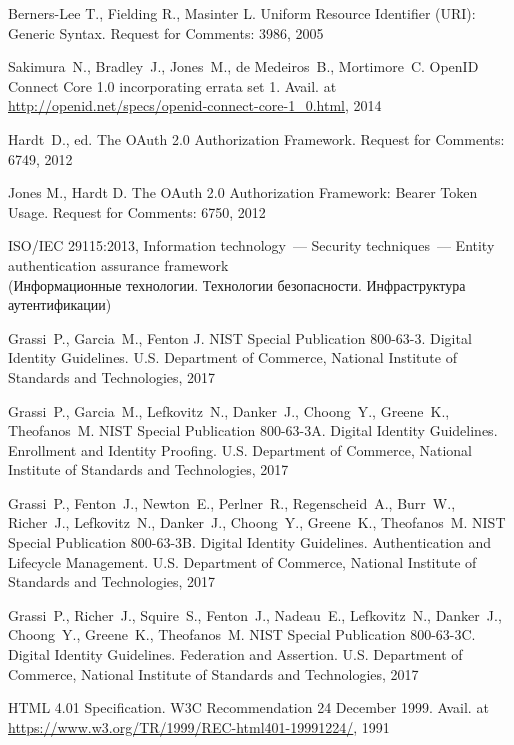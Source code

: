 \clearpage
\begin{thebibliography}{99}

Berners-Lee T., Fielding R., Masinter L. 
Uniform Resource Identifier (URI): Generic Syntax.
Request for Comments: 3986, 2005

Sakimura~N., Bradley~J., Jones~M., de Medeiros~B., Mortimore~C. 
OpenID Connect Core 1.0 incorporating errata set 1.
Avail. at \url{http://openid.net/specs/openid-connect-core-1_0.html}, 2014

Hardt~D., ed.
The OAuth 2.0 Authorization Framework.
Request for Comments: 6749, 2012

Jones M., Hardt D.
The OAuth 2.0 Authorization Framework: Bearer Token Usage.
Request for Comments: 6750, 2012

ISO/IEC 29115:2013, Information technology~---
Security techniques~--– Entity authentication assurance framework\\
{\small (Информационные технологии. Технологии безопасности. Инфраструктура 
аутентификации)}

Grassi~P., Garcia~M., Fenton J.
NIST Special Publication 800-63-3. Digital Identity Guidelines.
U.S. Department of Commerce, National Institute of Standards and Technologies, 
2017

Grassi~P., Garcia~M., 
Lefkovitz~N., Danker~J., 
Choong~Y., Greene~K., Theofanos~M. 
NIST Special Publication 800-63-3A. Digital Identity Guidelines. Enrollment and 
Identity Proofing.
U.S. Department of Commerce, National Institute of Standards and Technologies, 
2017

Grassi~P., Fenton~J., Newton~E., Perlner~R., Regenscheid~A., Burr~W., Richer~J., 
Lefkovitz~N., Danker~J., 
Choong~Y., Greene~K., Theofanos~M. 
NIST Special Publication 800-63-3B. Digital Identity Guidelines. 
Authentication and Lifecycle Management.
U.S. Department of Commerce, National Institute of Standards and Technologies, 
2017

Grassi~P., Richer~J., Squire~S., Fenton~J., Nadeau~E., 
Lefkovitz~N., Danker~J., 
Choong~Y., Greene~K., Theofanos~M.
NIST Special Publication 800-63-3C. Digital Identity Guidelines. 
Federation and Assertion.
U.S. Department of Commerce, National Institute of Standards and Technologies, 
2017 

HTML 4.01 Specification. 
W3C Recommendation 24 December 1999.
Avail. at \url{https://www.w3.org/TR/1999/REC-html401-19991224/}, 1991


\end{thebibliography}
